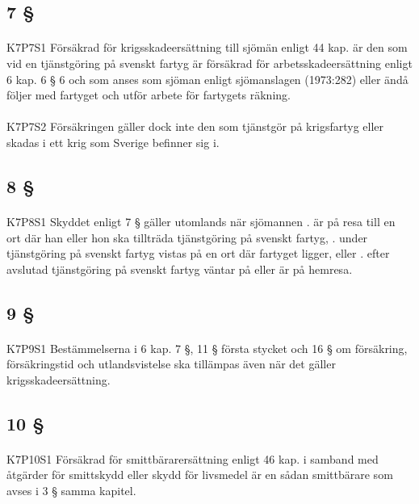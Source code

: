 \documentclass[a4paper,notitlepage,openany,10pt]{book}
\begin{document}
\subsection*{7 §}
\paragraph*{}
{\tiny K7P7S1}
Försäkrad för krigsskadeersättning till sjömän enligt 44 kap. är den som vid en tjänstgöring på svenskt fartyg är försäkrad för arbetsskadeersättning enligt 6 kap. 6 § 6 och som anses som sjöman enligt sjömanslagen (1973:282) eller ändå följer med fartyget och utför arbete för fartygets räkning.
\paragraph*{}
{\tiny K7P7S2}
Försäkringen gäller dock inte den som tjänstgör på krigsfartyg eller skadas i ett krig som Sverige befinner sig i.
\subsection*{8 §}
\paragraph*{}
{\tiny K7P8S1}
Skyddet enligt 7 § gäller utomlands när sjömannen
. är på resa till en ort där han eller hon ska tillträda tjänstgöring på svenskt fartyg,
. under tjänstgöring på svenskt fartyg vistas på en ort där fartyget ligger, eller
. efter avslutad tjänstgöring på svenskt fartyg väntar på eller är på hemresa.
\subsection*{9 §}
\paragraph*{}
{\tiny K7P9S1}
Bestämmelserna i 6 kap. 7 §, 11 § första stycket och 16 § om försäkring, försäkringstid och utlandsvistelse ska tillämpas även när det gäller krigsskadeersättning.
\subsection*{10 §}
\paragraph*{}
{\tiny K7P10S1}
Försäkrad för smittbärarersättning enligt 46 kap. i samband med åtgärder för smittskydd eller skydd för livsmedel är en sådan smittbärare som avses i 3 § samma kapitel.
\end{document}
